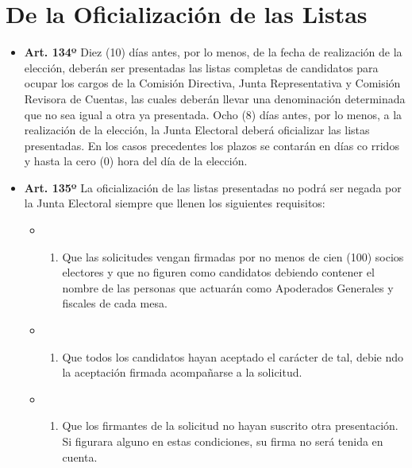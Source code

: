 \documentclass[]{book}
\providecommand{\tightlist}{%
  \setlength{\itemsep}{0pt}\setlength{\parskip}{0pt}}
\begin{document}
\section{De la Oficialización de las
Listas}\label{de-la-oficializacion-de-las-listas}

\begin{itemize}
\tightlist
\item
  \textbf{Art. 134º} Diez (10) días antes, por lo menos, de la fecha de
  realización de la elección, deberán ser presentadas las listas
  completas de candidatos para ocupar los cargos de la Comisión
  Directiva, Junta Representativa y Comisión Revisora de Cuentas, las
  cuales deberán llevar una denominación determinada que no sea igual a
  otra ya presentada. Ocho (8) días antes, por lo menos, a la
  realización de la elección, la Junta Electoral deberá oficializar las
  listas presentadas. En los casos precedentes los plazos se contarán en
  días co rridos y hasta la cero (0) hora del día de la elección.
\end{itemize}

\begin{itemize}
\tightlist
\item
  \textbf{Art. 135º} La oficialización de las listas presentadas no
  podrá ser negada por la Junta Electoral siempre que llenen los
  siguientes requisitos:

  \begin{itemize}
  \item
    \begin{enumerate}
    \def\labelenumi{\alph{enumi})}
    \tightlist
    \item
      Que las solicitudes vengan firmadas por no menos de cien (100)
      socios electores y que no figuren como candidatos debiendo
      contener el nombre de las personas que actuarán como Apoderados
      Generales y fiscales de cada mesa.
    \end{enumerate}
  \item
    \begin{enumerate}
    \def\labelenumi{\alph{enumi})}
    \setcounter{enumi}{1}
    \tightlist
    \item
      Que todos los candidatos hayan aceptado el carácter de tal, debie
      ndo la aceptación firmada acompañarse a la solicitud.
    \end{enumerate}
  \item
    \begin{enumerate}
    \def\labelenumi{\alph{enumi})}
    \setcounter{enumi}{2}
    \tightlist
    \item
      Que los firmantes de la solicitud no hayan suscrito otra
      presentación. Si figurara alguno en estas condiciones, su firma no
      será tenida en cuenta.
    \end{enumerate}
  \end{itemize}
\end{itemize}
\end{document}
